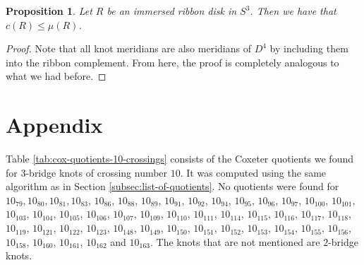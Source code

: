 \documentclass{article}
\newtheorem{proposition}[theorem]{Proposition}
\theoremstyle{definition}
\begin{document}
\begin{proposition}
Let $R$ be an immersed ribbon disk in $S^3$. Then we have that $c(R) \leq \mu(R)$.
\end{proposition}

\begin{proof}
Note that all knot meridians are also meridians of $D^4$ by including them into the ribbon complement. From here, the proof is completely analogous to what we had before.
\end{proof}



\appendix
\section{Appendix}\label{sec:data}
Table \ref{tab:cox-quotients-10-crossings} consists of the Coxeter quotients we found for $3$-bridge knots of crossing number $10$. It was computed using the same algorithm as in Section \ref{subsec:list-of-quotients}. No quotients were found for $10_{79}, 10_{80}, 10_{81}, 
10_{83}$, $10_{86}$, $10_{88}$, $10_{89}$, $10_{91}$, $10_{92}$, $10_{94}$, $10_{95}$, $10_{96}$, $10_{97}$,
$10_{100}$, $10_{101}$, $10_{103}$, $10_{104}$, $10_{105}$, $10_{106}$, $10_{107}$, $10_{109}$, $10_{110}$, $10_{111}$, $10_{114}$, $10_{115}$, $10_{116}$, $10_{117}$, $10_{118}$, $10_{119}$, $10_{121}$, $10_{122}$, $10_{123}$,
$10_{148}$, $10_{149}$, $10_{150}$, $10_{151}$, $10_{152}$, $10_{153}$, $10_{154}$, $10_{155}$, $10_{156}$, $10_{158}$,
$10_{160}$, $10_{161}$, $10_{162}$ and $10_{163}$. The knots that are not mentioned are $2$-bridge knots.
\end{document}
